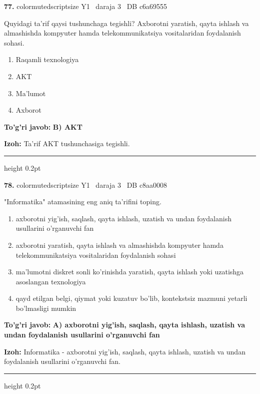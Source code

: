 \documentclass[10pt,a4paper,oneside]{article}
\begin{document}
\noindent\textbf{\color{ink}77.}  {color{muted}scriptsize Y1 \textbullet\ daraja 3 \textbullet\ DB c6a69555}
\par
Quyidagi ta'rif qaysi tushunchaga tegishli? Axborotni yaratish, qayta ishlash va almashishda kompyuter hamda telekommunikatsiya vositalaridan foydalanish sohasi.
\begin{enumerate}[label=\Alph*),leftmargin=9mm]
\item Raqamli texnologiya
\item AKT
\item Ma'lumot
\item Axborot
\end{enumerate}
\begin{tcolorbox}[enhanced,breakable,colback=teal!4,colframe=teal!50!black,boxrule=0.5pt,arc=1.1mm,left=3mm,right=3mm,top=1.7mm,bottom=1.7mm,before skip=2mm,after skip=2mm]
\textbf{\color{teal}To'g'ri javob:} \textbf{B) AKT}
\par\smallskip
\textbf{Izoh:} Ta'rif AKT tushunchasiga tegishli.
\end{tcolorbox}
\vspace{2mm}\hrule height 0.2pt \vspace{3mm}

\noindent\textbf{\color{ink}78.}  {color{muted}scriptsize Y1 \textbullet\ daraja 3 \textbullet\ DB c8aa0008}
\par
"Informatika" atamasining eng aniq ta'rifini toping.
\begin{enumerate}[label=\Alph*),leftmargin=9mm]
\item axborotni yig'ish, saqlash, qayta ishlash, uzatish va undan foydalanish usullarini o'rganuvchi fan
\item axborotni yaratish, qayta ishlash va almashishda kompyuter hamda telekommunikatsiya vositalaridan foydalanish sohasi
\item ma'lumotni diskret sonli ko'rinishda yaratish, qayta ishlash yoki uzatishga asoslangan texnologiya
\item qayd etilgan belgi, qiymat yoki kuzatuv bo'lib, kontekstsiz mazmuni yetarli bo'lmasligi mumkin
\end{enumerate}
\begin{tcolorbox}[enhanced,breakable,colback=teal!4,colframe=teal!50!black,boxrule=0.5pt,arc=1.1mm,left=3mm,right=3mm,top=1.7mm,bottom=1.7mm,before skip=2mm,after skip=2mm]
\textbf{\color{teal}To'g'ri javob:} \textbf{A) axborotni yig'ish, saqlash, qayta ishlash, uzatish va undan foydalanish usullarini o'rganuvchi fan}
\par\smallskip
\textbf{Izoh:} Informatika - axborotni yig'ish, saqlash, qayta ishlash, uzatish va undan foydalanish usullarini o'rganuvchi fan.
\end{tcolorbox}
\vspace{2mm}\hrule height 0.2pt \vspace{3mm}
\end{document}
